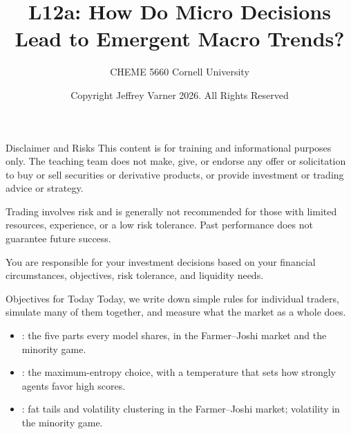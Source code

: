 \documentclass[aspectratio=169,11pt]{beamer}
\title{\texorpdfstring{{\vnheavy L12a}}{L12a}: How Do Micro Decisions Lead to Emergent Macro Trends?}
\subtitle{CHEME 5660 Cornell University}
\author{Copyright Jeffrey Varner 2026. All Rights Reserved}
\begin{document}
\vntitlepage

\begin{frame}{Disclaimer and Risks}
  \vspace{0.6em}
  \textbf{} This content is for training and informational
  purposes only. The teaching team does not make, give, or endorse any offer or
  solicitation to buy or sell securities or derivative products, or provide
  investment or trading advice or strategy.

  \vspace{1.1em}
  \textbf{} Trading involves risk and is generally not recommended for
  those with limited resources, experience, or a low risk tolerance. Past
  performance does not guarantee future success.

  \vspace{1.1em}
  \textbf{} You are responsible for your investment decisions
  based on your financial circumstances, objectives, risk tolerance, and
  liquidity needs.
\end{frame}

\begin{frame}{Objectives for Today}
  Today, we write down simple rules for individual traders, simulate many of them
  together, and measure what the market as a whole does.

  \vspace{0.5em}
  {\large\textbf{}}
  \begin{itemize}\setlength{\itemsep}{0.4em}
    \item {}: the five parts every model shares, in the
      Farmer–Joshi market and the minority game.
    \item {}: the maximum-entropy choice, with a
      temperature that sets how strongly agents favor high scores.
    \item {}: fat tails and volatility clustering in the
      Farmer–Joshi market; volatility in the minority game.
  \end{itemize}
\end{frame}
\end{document}
